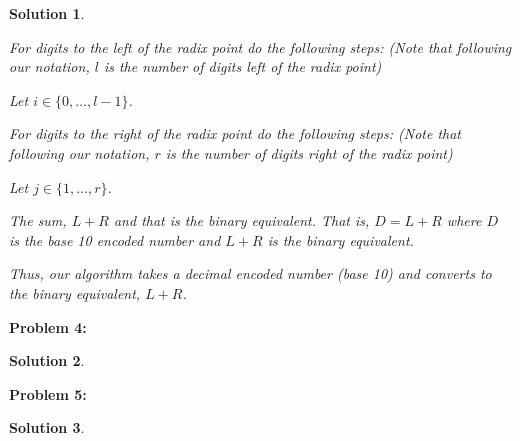 \documentclass[12pt, letterpaper]{article}
\theoremstyle{nonumberplain}
\newtheorem{sol}{Solution}
\begin{document}
\begin{sol}
\begin{enumerate}[label=\alph*)]
		      For digits to the left of the radix point do the following steps: (Note that following our notation, $l$ is the number of digits left of the radix point)

		      Let $i\in \{0, \ldots, l-1\}$.

		      For digits to the right of the radix point do the following steps: (Note that following our notation, $r$ is the number of digits right of the radix point)

		      Let $j\in \{1, \ldots, r\}$.

		      The sum, $L+R$ and that is the binary equivalent. That is, $D = L+R$ where $D$ is the base 10 encoded number and $L+R$ is the binary equivalent.

		      Thus, our algorithm takes a decimal encoded number (base 10) and converts to the binary equivalent, $L+R$.



	\end{enumerate}
\end{sol}

\hspace{18pt}\textbf{Problem 4:} \medskip
\begin{sol}

\end{sol}

\hspace{18pt}\textbf{Problem 5:} \medskip
\begin{sol}

\end{sol}
\end{document}
